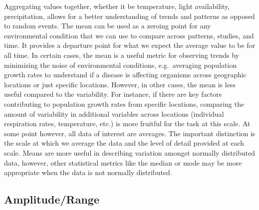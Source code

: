\documentclass[12pt,twoside]{reedthesis}
\begin{document}
Aggregating values together, whether it be temperature, light availability, precipitation, allows for a better understanding of trends and patterns as opposed to random events. The mean can be used as a zeroing point for any environmental condition that we can use to compare across patterns, studies, and time. It provides a departure point for what we expect the average value to be for all time. In certain cases, the mean is a useful metric for observing trends by minimizing the noise of environmental conditions, e.g.~averaging population growth rates to understand if a disease is affecting organisms across geographic locations or just specific locations. However, in other cases, the mean is less useful compared to the variability. For instance, if there are key factors contributing to population growth rates from specific locations, comparing the amount of variability in additional variables across locations (individual respiration rates, temperature, etc.) is more fruitful for the task at this scale. At some point however, all data of interest are averages. The important distinction is the scale at which we average the data and the level of detail provided at each scale. Means are more useful in describing variation amongst normally distributed data, however, other statistical metrics like the median or mode may be more appropriate when the data is not normally distributed.

\hypertarget{amplituderange}{%
\subsection{Amplitude/Range}\label{amplituderange}}
\end{document}
